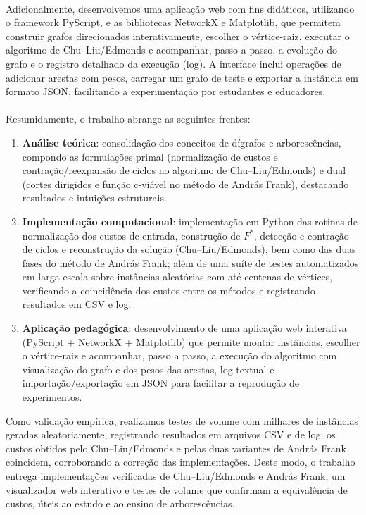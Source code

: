 \documentclass[12pt,a4paper]{article}
\begin{document}
\paragraph{}
Adicionalmente, desenvolvemos uma aplicação web com fins didáticos, utilizando o framework PyScript, e as bibliotecas NetworkX e Matplotlib, que permitem construir grafos direcionados interativamente, escolher o vértice-raiz, executar o algoritmo de Chu--Liu/Edmonds e acompanhar, passo a passo, a evolução do grafo e o registro detalhado da execução (log). A interface inclui operações de adicionar arestas com pesos, carregar um grafo de teste e exportar a instância em formato JSON, facilitando a experimentação por estudantes e educadores.  

\paragraph{}
Resumidamente, o trabalho abrange as seguintes frentes:  

\begin{enumerate}
    \item \textbf{Análise teórica}: consolidação dos conceitos de dígrafos e arborescências, compondo as formulações primal (normalização de custos e contração/reexpansão de ciclos no algoritmo de Chu--Liu/Edmonds) e dual (cortes dirigidos e função c-viável no método de András Frank), destacando resultados e intuições estruturais.
    \item \textbf{Implementação computacional}: implementação em Python das rotinas de normalização dos custos de entrada, construção de \(F^\ast\), detecção e contração de ciclos e reconstrução da solução (Chu--Liu/Edmonds), bem como das duas fases do método de András Frank; além de uma suíte de testes automatizados em larga escala sobre instâncias aleatórias com até centenas de vértices, verificando a coincidência dos custos entre os métodos e registrando resultados em CSV e log.
    \item \textbf{Aplicação pedagógica}: desenvolvimento de uma aplicação web interativa (PyScript + NetworkX + Matplotlib) que permite montar instâncias, escolher o vértice-raiz e acompanhar, passo a passo, a execução do algoritmo com visualização do grafo e dos pesos das arestas, log textual e importação/exportação em JSON para facilitar a reprodução de experimentos.
\end{enumerate}

Como validação empírica, realizamos testes de volume com milhares de instâncias geradas aleatoriamente, registrando resultados em arquivos CSV e de log; os custos obtidos pelo Chu--Liu/Edmonds e pelas duas variantes de András Frank coincidem, corroborando a correção das implementações. Deste modo, o trabalho entrega implementações verificadas de Chu--Liu/Edmonds e András Frank, um visualizador web interativo e testes de volume que confirmam a equivalência de custos, úteis ao estudo e ao ensino de arborescências.
\end{document}
